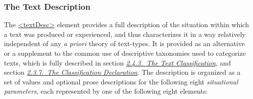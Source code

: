 \subsubsection[{The Text Description}]{The Text Description}\label{CCAHTD}\par
The \hyperref[TEI.textDesc]{<textDesc>} element provides a full description of the situation within which a text was produced or experienced, and thus characterizes it in a way relatively independent of any \textit{a priori} theory of text-types. It is provided as an alternative or a supplement to the common use of descriptive taxonomies used to categorize texts, which is fully described in section \textit{\hyperref[HD43]{2.4.3.\ The Text Classification}}, and section \textit{\hyperref[HD55]{2.3.7.\ The Classification Declaration}}. The description is organized as a set of values and optional prose descriptions for the following eight \textit{situational parameters}, each represented by one of the following eight elements: 
